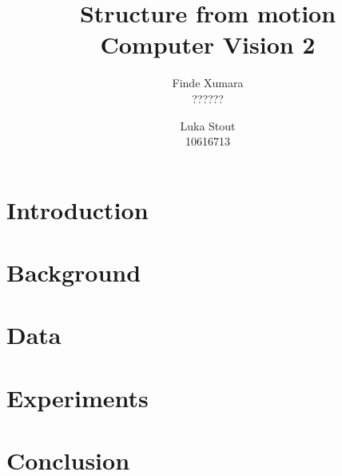\documentclass{article}
\title{Structure from motion \\ \small{Computer Vision 2}}
\author{Finde Xumara \\ ?????? \and Luka Stout \\ 10616713}
\begin{document}
\maketitle

\section{Introduction}




\section{Background}

\section{Data}

\section{Experiments}

\section{Conclusion}
\end{document}
